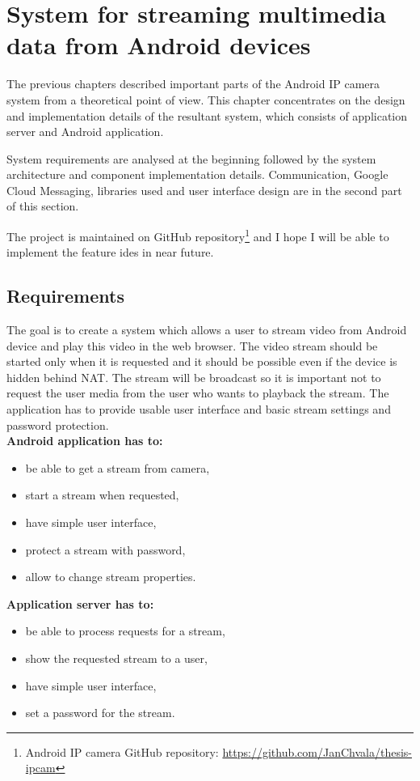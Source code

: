 % 
\chapter{System for streaming multimedia data from Android devices}
\label{chap:chapter5}
The previous chapters described important parts of the Android IP camera system from a theoretical point of view. This chapter concentrates on the design and implementation details of the resultant system, which consists of application server and Android application.

System requirements are analysed at the beginning followed by the system architecture and component implementation details.  Communication, Google Cloud Messaging, libraries used and user interface design are in the second part of this section.

The project is maintained on GitHub repository\footnote{Android IP camera GitHub repository: \url{https://github.com/JanChvala/thesis-ipcam}} and I hope I will be able to implement the feature ides in near future.


\section{Requirements}
The goal is to create a system which allows a user to stream video from Android device and play this video in the web browser. The video stream should be started only when it is requested and it should be possible even if the device is hidden behind NAT. The stream will be broadcast so it is important not to request the user media from the user who wants to playback the stream. The application has to provide usable user interface and basic stream settings and password protection.\\

\noindent
\textbf{Android application has to:}\vspace{-0.3em}
\begin{itemize}
	\item be able to get a stream from camera,
	\item start a stream when requested,
	\item have simple user interface,
	\item protect a stream with password,
	\item allow to change stream properties.
\end{itemize}

\newpage
\noindent
\textbf{Application server has to:}\vspace{-0.5em}
\begin{itemize}
	\item be able to process requests for a stream,
	\item show the requested stream to a user,
	\item have simple user interface,
	\item set a password for the stream.
\end{itemize}

